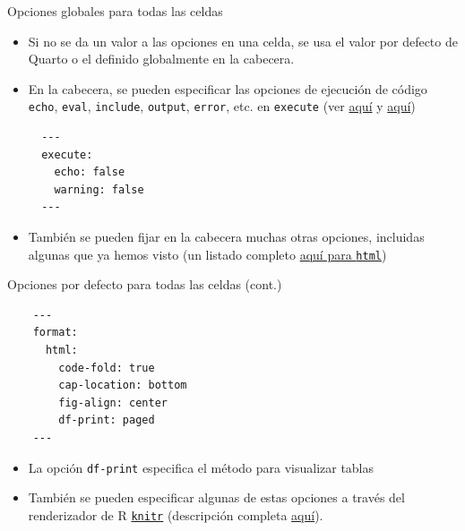 \documentclass[
  10pt,
  ignorenonframetext,
]{beamer}
\providecommand{\tightlist}{%
  \setlength{\itemsep}{0pt}\setlength{\parskip}{0pt}}\usepackage{longtable,booktabs,array}
\begin{document}
\begin{frame}[fragile]{Opciones globales para todas las celdas}
\label{opciones-globales-para-todas-las-celdas}
\begin{itemize}
\item
  Si no se da un valor a las opciones en una celda, se usa el valor por
  defecto de Quarto o el definido globalmente en la cabecera.
\item
  En la cabecera, se pueden especificar las opciones de ejecución de
  código \texttt{echo}, \texttt{eval}, \texttt{include},
  \texttt{output}, \texttt{error}, etc. en \texttt{execute} (ver
  \href{https://quarto.org/docs/reference/formats/html.html\#execution}{aquí}
  y \href{https://quarto.org/docs/computations/r.html}{aquí})

\begin{verbatim}
  ---
  execute:
    echo: false
    warning: false
  ---
\end{verbatim}
\end{itemize}

\begin{itemize}
\tightlist
\item
  También se pueden fijar en la cabecera muchas otras opciones,
  incluidas algunas que ya hemos visto (un listado completo
  \href{https://quarto.org/docs/reference/formats/html.html}{aquí para
  \texttt{html}})
\end{itemize}
\end{frame}

\begin{frame}[fragile]{Opciones por defecto para todas las celdas
(cont.)}
\label{opciones-por-defecto-para-todas-las-celdas-cont.}
\begin{verbatim}
    ---
    format:
      html:
        code-fold: true
        cap-location: bottom
        fig-align: center
        df-print: paged
    ---
\end{verbatim}

\begin{itemize}
\tightlist
\item
  La opción \texttt{df-print} especifica el método para visualizar
  tablas
\end{itemize}

\begin{itemize}
\tightlist
\item
  También se pueden especificar algunas de estas opciones a través del
  renderizador de R
  \href{https://quarto.org/docs/computations/r.html\#knitr-options}{\texttt{knitr}}
  (descripción completa
  \href{https://bookdown.org/yihui/rmarkdown/html-document.html}{aquí}).
\end{itemize}
\end{frame}
\end{document}
